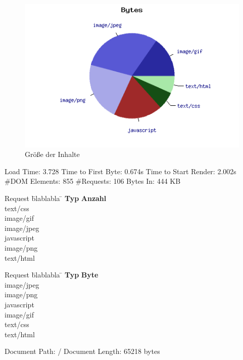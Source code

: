 \begin{figure}[htbp]
  \centering
  \includegraphics[scale=0.5]{material/start_byte_pie.png}
  \caption{Größe der Inhalte}
  \label{fig:startbyte}
\end{figure}

Load Time: 3.728
Time to First Byte: 0.674s 	
Time to Start Render: 2.002s
\#DOM Elements: 855 	
\#Requests: 106
Bytes In: 444 KB
\begin{tabbing}
Request \quad\= blablabla \quad\= \kill
\textbf{Typ} 	 \> \textbf{Anzahl} \\
text/css	  	\\
image/gif	  	\\
image/jpeg	  	\\
javascript	  	\\ 
image/png	  	\\
text/html	  	\\
\end{tabbing}

\begin{tabbing}
Request \quad\= blablabla \quad\= \kill
\textbf{Typ} 	 \> \textbf{Byte} \\
image/jpeg	\\
image/png	\\
javascript	\\
image/gif	\\
text/css	\\
text/html	\\

\end{tabbing}


Document Path:          /
Document Length:        65218 bytes

